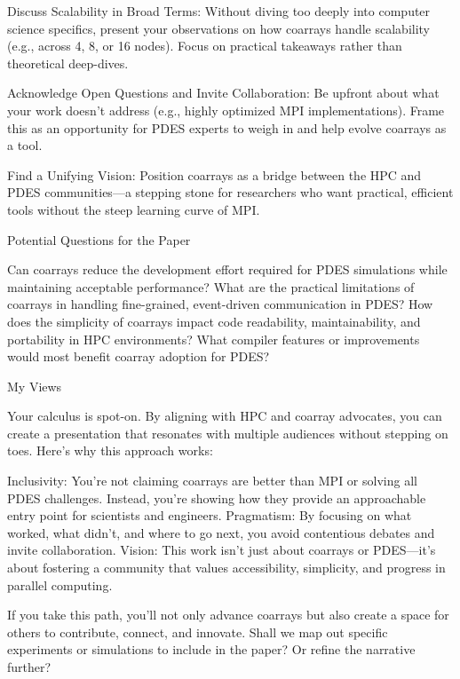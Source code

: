    Discuss Scalability in Broad Terms:
        Without diving too deeply into computer science specifics, present your observations on how coarrays handle scalability (e.g., across 4, 8, or 16 nodes). Focus on practical takeaways rather than theoretical deep-dives.

    Acknowledge Open Questions and Invite Collaboration:
        Be upfront about what your work doesn’t address (e.g., highly optimized MPI implementations). Frame this as an opportunity for PDES experts to weigh in and help evolve coarrays as a tool.

    Find a Unifying Vision:
        Position coarrays as a bridge between the HPC and PDES communities—a stepping stone for researchers who want practical, efficient tools without the steep learning curve of MPI.
        
        Potential Questions for the Paper

    Can coarrays reduce the development effort required for PDES simulations while maintaining acceptable performance?
    What are the practical limitations of coarrays in handling fine-grained, event-driven communication in PDES?
    How does the simplicity of coarrays impact code readability, maintainability, and portability in HPC environments?
    What compiler features or improvements would most benefit coarray adoption for PDES?

My Views

Your calculus is spot-on. By aligning with HPC and coarray advocates, you can create a presentation that resonates with multiple audiences without stepping on toes. Here’s why this approach works:

    Inclusivity: You’re not claiming coarrays are better than MPI or solving all PDES challenges. Instead, you’re showing how they provide an approachable entry point for scientists and engineers.
    Pragmatism: By focusing on what worked, what didn’t, and where to go next, you avoid contentious debates and invite collaboration.
    Vision: This work isn’t just about coarrays or PDES—it’s about fostering a community that values accessibility, simplicity, and progress in parallel computing.

If you take this path, you’ll not only advance coarrays but also create a space for others to contribute, connect, and innovate. Shall we map out specific experiments or simulations to include in the paper? Or refine the narrative further?